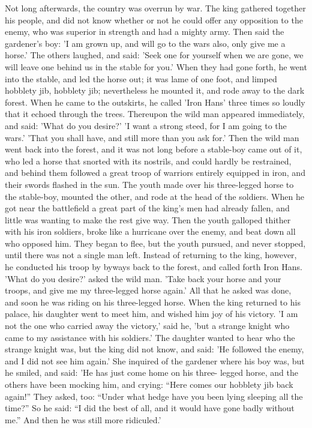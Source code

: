 \documentclass[12pt]{book}
\begin{document}
Not long afterwards, the country was overrun by war. The king gathered
together his people, and did not know whether or not he could offer
any opposition to the enemy, who was superior in strength and had a
mighty army. Then said the gardener's boy: 'I am grown up, and will go
to the wars also, only give me a horse.' The others laughed, and said:
'Seek one for yourself when we are gone, we will leave one behind us
in the stable for you.' When they had gone forth, he went into the
stable, and led the horse out; it was lame of one foot, and limped
hobblety jib, hobblety jib; nevertheless he mounted it, and rode away
to the dark forest. When he came to the outskirts, he called 'Iron
Hans' three times so loudly that it echoed through the trees.
Thereupon the wild man appeared immediately, and said: 'What do you
desire?' 'I want a strong steed, for I am going to the wars.' 'That
you shall have, and still more than you ask for.' Then the wild man
went back into the forest, and it was not long before a stable-boy
came out of it, who led a horse that snorted with its nostrils, and
could hardly be restrained, and behind them followed a great troop of
warriors entirely equipped in iron, and their swords flashed in the
sun. The youth made over his three-legged horse to the stable-boy,
mounted the other, and rode at the head of the soldiers. When he got
near the battlefield a great part of the king's men had already
fallen, and little was wanting to make the rest give way. Then the
youth galloped thither with his iron soldiers, broke like a hurricane
over the enemy, and beat down all who opposed him. They began to flee,
but the youth pursued, and never stopped, until there was not a single
man left. Instead of returning to the king, however, he conducted his
troop by byways back to the forest, and called forth Iron Hans. 'What
do you desire?' asked the wild man. 'Take back your horse and your
troops, and give me my three-legged horse again.' All that he asked
was done, and soon he was riding on his three-legged horse. When the
king returned to his palace, his daughter went to meet him, and wished
him joy of his victory. 'I am not the one who carried away the
victory,' said he, 'but a strange knight who came to my assistance
with his soldiers.' The daughter wanted to hear who the strange knight
was, but the king did not know, and said: 'He followed the enemy, and
I did not see him again.' She inquired of the gardener where his boy
was, but he smiled, and said: 'He has just come home on his three-
legged horse, and the others have been mocking him, and crying: ``Here
comes our hobblety jib back again!'' They asked, too: ``Under what hedge
have you been lying sleeping all the time?'' So he said: ``I did the
best of all, and it would have gone badly without me.'' And then he was
still more ridiculed.'
\end{document}
